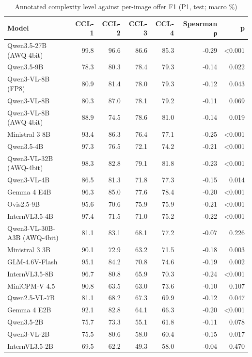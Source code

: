 \begin{table}[t]
\centering
\caption{Annotated complexity level against per-image offer F1 (P1, test; macro \%)}
\label{tab:cclvalidity}
\small
\begin{tabular}{lrrrrrr}
\toprule
Model & CCL-1 & CCL-2 & CCL-3 & CCL-4 & Spearman ρ & p \\
\midrule
Qwen3.5-27B (AWQ-4bit) & 99.8 & 96.6 & 86.6 & 85.3 & -0.29 & <0.001 \\
Qwen3.5-9B & 78.3 & 80.3 & 78.4 & 79.3 & -0.14 & 0.022 \\
Qwen3-VL-8B (FP8) & 80.9 & 81.4 & 78.0 & 79.3 & -0.12 & 0.043 \\
Qwen3-VL-8B & 80.3 & 87.0 & 78.1 & 79.2 & -0.11 & 0.069 \\
Qwen3-VL-8B (AWQ-4bit) & 88.9 & 74.5 & 78.6 & 81.0 & -0.14 & 0.019 \\
Ministral 3 8B & 93.4 & 86.3 & 76.4 & 77.1 & -0.25 & <0.001 \\
Qwen3.5-4B & 97.3 & 76.5 & 72.1 & 74.2 & -0.21 & <0.001 \\
Qwen3-VL-32B (AWQ-4bit) & 98.3 & 82.8 & 79.1 & 81.8 & -0.23 & <0.001 \\
Qwen3-VL-4B & 86.5 & 81.3 & 71.8 & 77.3 & -0.15 & 0.014 \\
Gemma 4 E4B & 96.3 & 85.0 & 77.6 & 78.4 & -0.20 & <0.001 \\
Ovis2.5-9B & 95.6 & 70.6 & 75.9 & 75.9 & -0.21 & <0.001 \\
InternVL3.5-4B & 97.4 & 71.5 & 71.0 & 75.2 & -0.22 & <0.001 \\
Qwen3-VL-30B-A3B (AWQ-4bit) & 81.1 & 83.1 & 68.1 & 77.2 & -0.07 & 0.226 \\
Ministral 3 3B & 90.1 & 72.9 & 63.2 & 71.5 & -0.18 & 0.003 \\
GLM-4.6V-Flash & 95.1 & 84.2 & 70.8 & 74.6 & -0.19 & 0.002 \\
InternVL3.5-8B & 96.7 & 80.8 & 65.9 & 70.3 & -0.24 & <0.001 \\
MiniCPM-V 4.5 & 90.8 & 63.5 & 63.0 & 73.6 & -0.10 & 0.107 \\
Qwen2.5-VL-7B & 81.1 & 68.2 & 67.3 & 69.9 & -0.12 & 0.047 \\
Gemma 4 E2B & 92.1 & 82.8 & 64.1 & 66.3 & -0.20 & <0.001 \\
Qwen3.5-2B & 75.7 & 73.3 & 55.1 & 61.8 & -0.11 & 0.078 \\
Qwen3-VL-2B & 75.5 & 80.6 & 58.0 & 60.4 & -0.15 & 0.017 \\
InternVL3.5-2B & 69.5 & 62.2 & 49.3 & 58.0 & -0.04 & 0.470 \\

\end{tabular}
\end{table}
